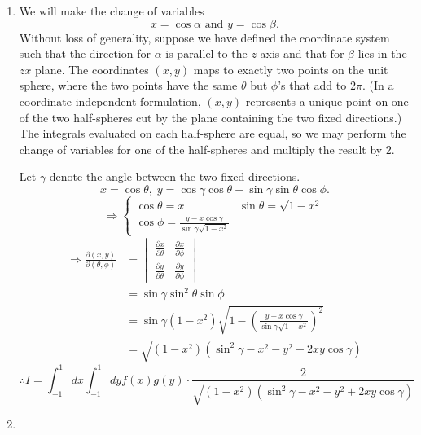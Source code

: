 \item

\begin{enumerate}[wide, labelindent = 0pt, label = (\arabic*)]
\item 
We will make the change of variables
\[
    x = \cos\alpha \text{ and } y=\cos\beta.
\]
Without loss of generality, suppose we have defined the coordinate system
such that the direction for $\alpha$ is parallel to the $z$ axis
and that for $\beta$ lies in the $zx$ plane.
The coordinates $(x, y)$ maps to exactly two points on the unit sphere,
where the two points have the same $\theta$ but $\phi$'s that add to $2\pi$.
(In a coordinate-independent formulation, $(x, y)$ represents a unique point
on one of the two half-spheres cut by the plane containing the two fixed directions.)
The integrals evaluated on each half-sphere are equal,
so we may perform the change of variables for one of the half-spheres
and multiply the result by 2.

Let $\gamma$ denote the angle between the two fixed directions.
\[
    x = \cos\theta,\;
    y = \cos\gamma\cos\theta + \sin\gamma\sin\theta\cos\phi.
\]
\[
    \Rightarrow \begin{cases}
        \cos\theta = x & \sin\theta = \sqrt{1 - x^2} \\
        \cos\phi = \frac{y - x\cos\gamma}{\sin\gamma \sqrt{1 - x^2}}
    \end{cases}
\]
\begin{align*}
    \Rightarrow \frac{\partial(x, y)}{\partial(\theta,\phi)}
    &= \begin{vmatrix}
        \frac{\partial x}{\partial \theta} & \frac{\partial x}{\partial \phi} \\
        \frac{\partial y}{\partial \theta} & \frac{\partial y}{\partial \phi}
    \end{vmatrix} \\
    &= \sin\gamma \sin^2 \theta \sin\phi \\
    &= \sin\gamma \left( 1 - x^2 \right) \sqrt{
        1 - {\left(
            \frac{y - x\cos\gamma}{\sin\gamma \sqrt{1 - x^2}} 
        \right)}^2
    } \\
    &= \sqrt{\left( 1 - x^2 \right) \left(
        \sin^2 \gamma - x^2 - y^2 + 2xy\cos\gamma
    \right)}
\end{align*}
\[
    \therefore I
    = \int_{-1}^1 dx \int_{-1}^1 dy f(x) g(y) \cdot \frac{2}{
        \sqrt{\left( 1 - x^2 \right) \left(
            \sin^2 \gamma - x^2 - y^2 + 2xy\cos\gamma
        \right)}
    }
\]

\item
\notyet
\end{enumerate}